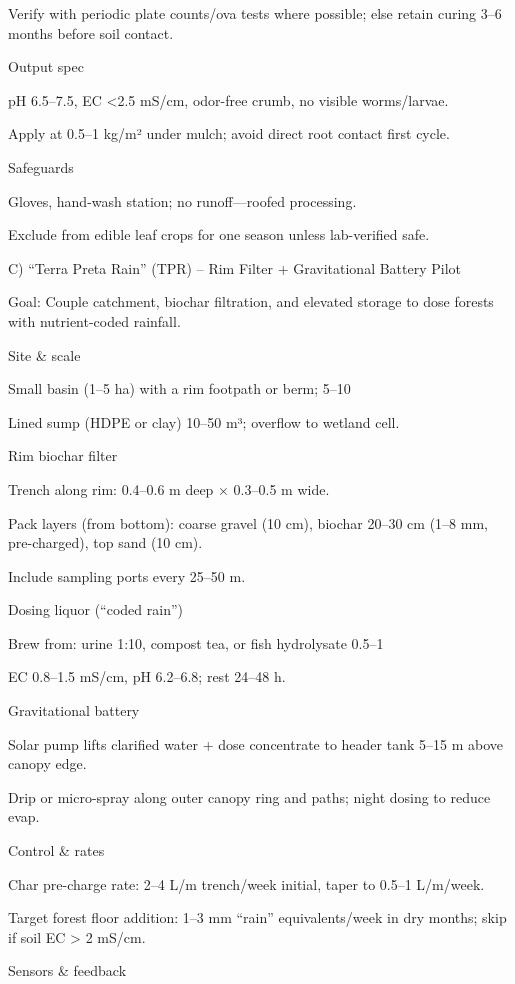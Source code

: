 \documentclass{article}
\begin{document}
Verify with periodic plate counts/ova tests where possible; else retain curing 3–6 months before soil contact.


Output spec

pH 6.5–7.5, EC <2.5 mS/cm, odor-free crumb, no visible worms/larvae.

Apply at 0.5–1 kg/m² under mulch; avoid direct root contact first cycle.


Safeguards

Gloves, hand-wash station; no runoff—roofed processing.

Exclude from edible leaf crops for one season unless lab-verified safe.


C) “Terra Preta Rain” (TPR) – Rim Filter + Gravitational Battery Pilot

Goal: Couple catchment, biochar filtration, and elevated storage to dose forests with nutrient-coded rainfall.

Site \& scale

Small basin (1–5 ha) with a rim footpath or berm; 5–10%

Lined sump (HDPE or clay) 10–50 m³; overflow to wetland cell.


Rim biochar filter

Trench along rim: 0.4–0.6 m deep × 0.3–0.5 m wide.

Pack layers (from bottom): coarse gravel (10 cm), biochar 20–30 cm (1–8 mm, pre-charged), top sand (10 cm).

Include sampling ports every 25–50 m.


Dosing liquor (“coded rain”)

Brew from: urine 1:10, compost tea, or fish hydrolysate 0.5–1%

EC 0.8–1.5 mS/cm, pH 6.2–6.8; rest 24–48 h.


Gravitational battery

Solar pump lifts clarified water + dose concentrate to header tank 5–15 m above canopy edge.

Drip or micro-spray along outer canopy ring and paths; night dosing to reduce evap.


Control \& rates

Char pre-charge rate: 2–4 L/m trench/week initial, taper to 0.5–1 L/m/week.

Target forest floor addition: 1–3 mm “rain” equivalents/week in dry months; skip if soil EC > 2 mS/cm.


Sensors \& feedback
\end{document}
